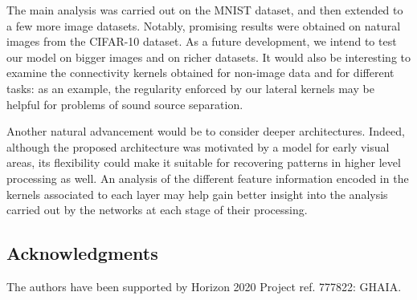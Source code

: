 \documentclass[11pt,oneside,reqno]{amsart}
\begin{document}
 The main analysis was carried out on the MNIST dataset, and then extended to a few more image datasets. Notably, promising results were obtained on natural images from the CIFAR-10 dataset. As a future development, we intend to test our model on bigger images and on richer datasets. It would also be interesting to examine the connectivity kernels obtained for non-image data and for different tasks: as an example, the regularity enforced by our lateral kernels may be helpful for problems of sound source separation. 
 
 Another natural advancement would be to consider deeper architectures. Indeed, although the proposed architecture was motivated by a model for early visual areas, its flexibility could make it suitable for recovering patterns in higher level processing as well. An analysis of the different feature information encoded in the kernels associated to each layer may help gain better insight into the analysis carried out by the networks at each stage of their processing.
 
 \subsection*{Acknowledgments}
 The authors have been supported by Horizon 2020 Project ref. 777822: GHAIA.

 
 
\end{document}
